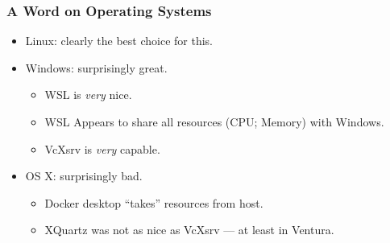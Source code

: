    \begin{frame}
      \frametitle{A Word on Operating Systems}
      \begin{itemize}
      \item<2-> Linux: clearly the best choice for this.
      \item<3-> Windows: surprisingly great.
        \begin{itemize}
        \item<4-> WSL is \textit{very} nice.
        \item<5-> WSL Appears to share all resources (CPU; Memory) with Windows.
        \item<6-> VcXsrv is \textit{very} capable.
        \end{itemize}
      \item<7-> OS X: surprisingly bad.
        \begin{itemize}
        \item<8-> Docker desktop ``takes'' resources from host.
        \item<9-> XQuartz was not as nice as VcXsrv --- at least in Ventura.
        \end{itemize}
      \end{itemize}
    \end{frame}


